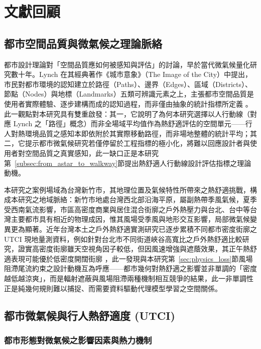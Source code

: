 \chapter{文獻回顧}
\label{chapter:relatedwork}

\section{都市空間品質與微氣候之理論脈絡}
\label{sec:urban_theory_context}

都市設計理論對「空間品質應如何被感知與評估」的討論，早於當代微氣候量化研究數十年。Lynch 在其經典著作《城市意象》（The Image of the City）中提出，市民對都市環境的認知建立於路徑（Paths）、邊界（Edges）、區域（Districts）、節點（Nodes）與地標（Landmarks）五類可辨識元素之上，主張都市空間品質是使用者實際體驗、逐步建構而成的認知過程，而非僅由抽象的統計指標所定義 \citep{lynch1960image}。此一觀點對本研究具有雙重啟發：其一，它說明了為何本研究選擇以人行動線（對應 Lynch 之「路徑」概念）而非全場域平均值作為熱舒適評估的空間單元——行人對熱環境品質之感知本即依附於其實際移動路徑，而非場地整體的統計平均；其二，它提示都市微氣候研究若僅停留於工程指標的極小化，將難以回應設計者與使用者對空間品質之真實感知，此一缺口正是本研究第~\ref{subsec:from_astar_to_walkway}節提出熱舒適人行動線設計評估指標之理論動機。

本研究之案例場域為台灣新竹市，其地理位置及氣候特性所帶來之熱舒適挑戰，構成本研究之地域脈絡：新竹市地處台灣西北部沿海平原，屬副熱帶季風氣候，夏季受西南氣流影響，市區高密度商業與居住混合街廓之戶外熱壓力與台北、台中等台灣主要都市具有相近的物理成因，惟其風場受季風與地形交互影響，局部微氣候變異更為顯著。近年台灣本土之戶外熱舒適實測研究已逐步累積不同都市密度街廓之 UTCI 現地量測資料，例如針對台北市不同街道峽谷高寬比之戶外熱舒適比較研究，證實高密度街廓雖天空視角因子較低，但因風速增強與遮蔭效果，其正午熱舒適表現可能優於低密度開闊街廓 \citep{su2023outdoor}，此一發現與本研究第~\ref{sec:physics_loss}節風場阻滯尾流約束之設計動機互為呼應——都市幾何對熱舒適之影響並非單調的「密度越低越涼爽」，而是輻射遮蔽與風場阻滯兩種機制相互競爭的結果，此一非單調性正是純幾何規則難以捕捉、而需要資料驅動代理模型學習之空間關係。


\section{都市微氣候與行人熱舒適度 (UTCI)}
\label{sec:utci_review}

\subsection{都市形態對微氣候之影響因素與熱力機制}
\label{subsec:urban_form_microclimate}

